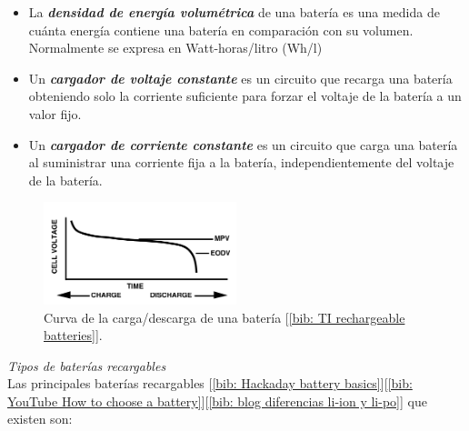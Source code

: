 \documentclass[12pt]{article}
\begin{document}
\begin{itemize}
 		\item La \textit{\textbf{densidad de energía volumétrica}} de una batería es una medida de cuánta energía contiene una batería en comparación con su volumen. Normalmente se expresa en Watt-horas/litro (Wh/l)
 		\item Un \textit{\textbf{cargador de voltaje constante}} es un circuito que recarga una batería obteniendo solo la corriente suficiente para forzar el voltaje de la batería a un valor fijo.
 		\item Un \textit{\textbf{cargador de corriente constante}} es un circuito que carga una batería al suministrar una corriente fija a la batería, independientemente del voltaje de la batería.
	\end{itemize}

	
	\begin{figure}[h!]
		\begin{center}
			\includegraphics[width=0.5\textwidth]{img/chargeDischargeCurve_TxInst.png}
			\caption{Curva de la carga/descarga de una batería [\ref{bib: TI rechargeable batteries}].}
			\label{fig: curva carga descarga bateria}
		\end{center}
	\end{figure}

	\pagebreak

	
	\noindent \textit{Tipos de baterías recargables}\\
	
	\noindent Las principales baterías recargables [\ref{bib: Hackaday battery basics}][\ref{bib: YouTube How to choose  a battery}][\ref{bib: blog diferencias li-ion y li-po}] que existen son: 
	
\end{document}
